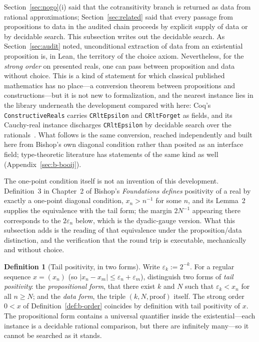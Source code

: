 \documentclass[11pt]{article}
\theoremstyle{definition}
\newtheorem{definition}[theorem]{Definition}
\theoremstyle{remark}
\begin{document}
Section~\ref{sec:nogo}(i) said that the cotransitivity branch is returned as data from rational approximations; Section~\ref{sec:related} said that every passage from propositions to data in the audited chain proceeds by explicit supply of data or by decidable search.  This subsection writes out the decidable search.  As Section~\ref{sec:audit} noted, unconditional extraction of data from an existential proposition is, in Lean, the territory of the choice axiom.  Nevertheless, for the \emph{strong order} on presented reals, one can pass between proposition and data without choice.  This is a kind of statement for which classical published mathematics has no place---a conversion theorem between propositions and constructions---but it is not new to formalization, and the nearest instance lies in the library underneath the development compared with here: Coq's \texttt{ConstructiveReals} carries \texttt{CRltEpsilon} and \texttt{CRltForget} as fields, and its Cauchy-real instance discharges \texttt{CRltEpsilon} by decidable search over the rationals~\cite{coq-constructive-reals}.  What follows is the same conversion, reached independently and built here from Bishop's own diagonal condition rather than posited as an interface field; type-theoretic literature has statements of the same kind as well (Appendix~\ref{sec:b-booij}).

The one-point condition itself is not an invention of this development.  Definition~3 in Chapter~2 of Bishop's \emph{Foundations} \emph{defines} positivity of a real by exactly a one-point diagonal condition, $x_n>n^{-1}$ for some $n$, and its Lemma~2 supplies the equivalence with the tail form; the margin $2N^{-1}$ appearing there corresponds to the $2\varepsilon_n$ below, which is the dyadic-gauge version.  What this subsection adds is the reading of that equivalence under the proposition/data distinction, and the verification that the round trip is executable, mechanically and without choice.

\begin{definition}[Tail positivity, in two forms]
\label{def:b-tail}
Write $\varepsilon_k:=2^{-k}$.  For a regular sequence $x=(x_n)$ (so $|x_n-x_m|\le\varepsilon_n+\varepsilon_m$), distinguish two forms of \emph{tail positivity}:
the \emph{propositional form}, that there exist $k$ and $N$ such that $\varepsilon_k<x_n$ for all $n\ge N$; and
the \emph{data form}, the triple $(k,N,\text{proof})$ itself.
The strong order $0<x$ of Definition~\ref{def:b-order} coincides by definition with tail positivity of $x$.  The propositional form contains a universal quantifier inside the existential---each instance is a decidable rational comparison, but there are infinitely many---so it cannot be searched as it stands.
\end{definition}
\end{document}

